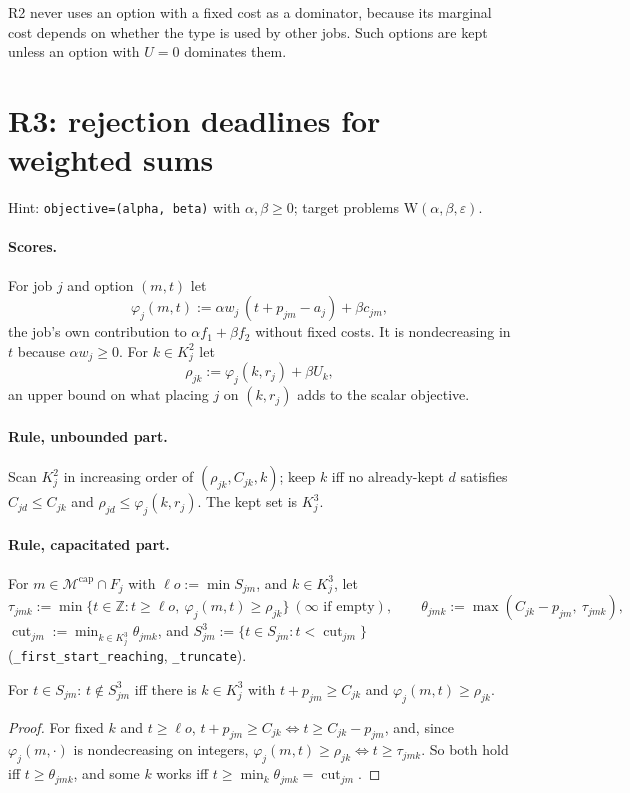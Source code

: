 \documentclass[11pt,a4paper]{article}
\newcommand{\M}{\mathcal{M}}
\newcommand{\Mcap}{\M^{\mathrm{cap}}}
\newcommand{\Cut}{\operatorname{cut}}
\newcommand{\Z}{\mathbb{Z}}
\newcommand{\code}[1]{\texttt{#1}}
\begin{document}
R2 never uses an option with a fixed cost as a dominator, because its
marginal cost depends on whether the type is used by other jobs. Such options
are kept unless an option with $U=0$ dominates them.

\section{R3: rejection deadlines for weighted sums}\label{sec:R3}

Hint: \code{objective=(alpha, beta)} with $\alpha,\beta\ge0$; target problems
$\mathrm W(\alpha,\beta,\varepsilon)$.

\paragraph{Scores.} For job $j$ and option $(m,t)$ let
\[
\varphi_j(m,t):=\alpha w_j\,(t+p_{jm}-a_j)+\beta c_{jm},
\]
the job's own contribution to $\alpha f_1+\beta f_2$ without fixed costs. It
is nondecreasing in $t$ because $\alpha w_j\ge0$. For $k\in K^2_j$ let
\[
\rho_{jk}:=\varphi_j(k,r_j)+\beta U_k ,
\]
an upper bound on what placing $j$ on $(k,r_j)$ adds to the scalar objective.

\paragraph{Rule, unbounded part.} Scan $K^2_j$ in increasing order of
$(\rho_{jk},C_{jk},k)$; keep $k$ iff no already-kept $d$ satisfies
$C_{jd}\le C_{jk}$ and $\rho_{jd}\le\varphi_j(k,r_j)$. The kept set is
$K^3_j$.

\paragraph{Rule, capacitated part.} For $m\in\Mcap\cap F_j$ with
$\ell o:=\min S_{jm}$, and $k\in K^3_j$, let
\[
\tau_{jmk}:=\min\{t\in\Z: t\ge \ell o,\ \varphi_j(m,t)\ge\rho_{jk}\}\ (\infty\text{ if empty}),\qquad
\theta_{jmk}:=\max(C_{jk}-p_{jm},\ \tau_{jmk}),
\]
$\Cut_{jm}:=\min_{k\in K^3_j}\theta_{jmk}$, and $S^{3}_{jm}:=\{t\in S_{jm}: t<\Cut_{jm}\}$
(\code{\_first\_start\_reaching}, \code{\_truncate}).

\begin{lemma}\label{lem:R3shape}
For $t\in S_{jm}$: $t\notin S^3_{jm}$ iff there is $k\in K^3_j$ with
$t+p_{jm}\ge C_{jk}$ and $\varphi_j(m,t)\ge\rho_{jk}$.
\end{lemma}
\begin{proof}
For fixed $k$ and $t\ge \ell o$, $t+p_{jm}\ge C_{jk}\iff t\ge C_{jk}-p_{jm}$,
and, since $\varphi_j(m,\cdot)$ is nondecreasing on integers,
$\varphi_j(m,t)\ge\rho_{jk}\iff t\ge\tau_{jmk}$. So both hold iff
$t\ge\theta_{jmk}$, and some $k$ works iff $t\ge\min_k\theta_{jmk}=\Cut_{jm}$.
\end{proof}
\end{document}
